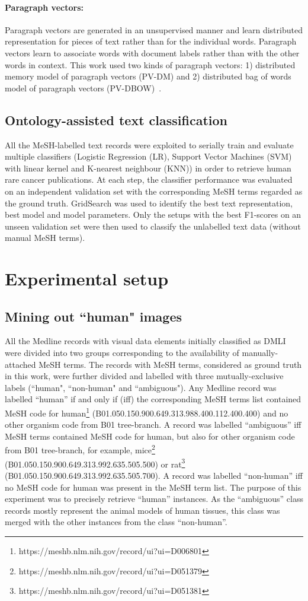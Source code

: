 \documentclass[]{spie}  %
\begin{document}
\paragraph{Paragraph vectors: }
Paragraph vectors are generated in an unsupervised manner and learn distributed representation for pieces of text rather than for the individual words.
Paragraph vectors learn to associate words with document labels rather than with the other words in context.
This work used two kinds of paragraph vectors: 1) distributed memory model of paragraph vectors (PV-DM) and
2) distributed bag of words model of paragraph vectors (PV-DBOW)~\cite{le2014distributed}.
% 
\subsection{Ontology-assisted text classification}
\label{subsec:onto_classi}
%
All the MeSH-labelled text records were exploited to serially train and evaluate multiple classifiers (Logistic Regression (LR), Support Vector Machines (SVM) with linear kernel and K-nearest neighbour (KNN)) in order to retrieve human rare cancer publications. 
At each step, the classifier performance was evaluated on an independent validation set with the corresponding MeSH terms regarded as the ground truth.
GridSearch was used to identify the best text representation, best model and model parameters.
Only the setups with the best F1-scores on an unseen validation set were then used to classify the unlabelled text data (without manual MeSH terms).
%
\section{Experimental setup}
\label{subsec:pipeline}
%
\subsection{Mining out ``human" images} 
\label{subsubsec:step2}
%
All the Medline records with visual data elements initially classified as DMLI were divided into two groups corresponding to the availability of manually-attached MeSH terms.
The records with MeSH terms, considered as ground truth in this work, were further divided and labelled with three mutually-exclusive labels (``human", ``non-human" and ``ambiguous").
Any Medline record was labelled ``human'' if and only if (iff) the corresponding MeSH terms list contained MeSH code for human\footnote{https://meshb.nlm.nih.gov/record/ui?ui=D006801} (B01.050.150.900.649.313.988.400.112.400.400) and no other organism code from B01 tree-branch.
A record was labelled ``ambiguous'' iff MeSH terms contained MeSH code for human, but also for other organism code from B01 tree-branch, for example, mice\footnote{https://meshb.nlm.nih.gov/record/ui?ui=D051379} (B01.050.150.900.649.313.992.635.505.500) or rat\footnote{https://meshb.nlm.nih.gov/record/ui?ui=D051381} (B01.050.150.900.649.313.992.635.505.700).
A record was labelled ``non-human'' iff no MeSH code for human was present in the MeSH term list.
The purpose of this experiment was to precisely retrieve ``human'' instances.
As the ``ambiguous'' class records mostly represent the animal models of human tissues, this class was merged with the other instances from the class ``non-human''.
\end{document}
